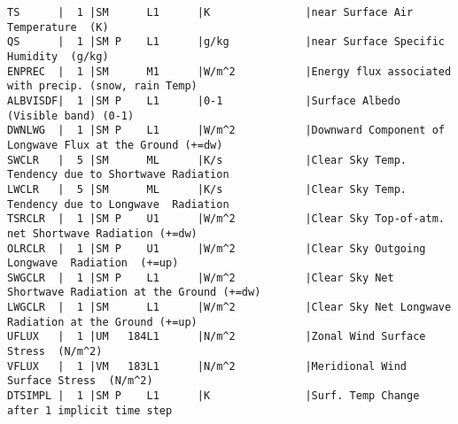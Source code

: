 \begin{verbatim}
TS      |  1 |SM      L1      |K               |near Surface Air Temperature  (K)
QS      |  1 |SM P    L1      |g/kg            |near Surface Specific Humidity  (g/kg)
ENPREC  |  1 |SM      M1      |W/m^2           |Energy flux associated with precip. (snow, rain Temp)
ALBVISDF|  1 |SM P    L1      |0-1             |Surface Albedo (Visible band) (0-1)
DWNLWG  |  1 |SM P    L1      |W/m^2           |Downward Component of Longwave Flux at the Ground (+=dw)
SWCLR   |  5 |SM      ML      |K/s             |Clear Sky Temp. Tendency due to Shortwave Radiation
LWCLR   |  5 |SM      ML      |K/s             |Clear Sky Temp. Tendency due to Longwave  Radiation
TSRCLR  |  1 |SM P    U1      |W/m^2           |Clear Sky Top-of-atm. net Shortwave Radiation (+=dw)
OLRCLR  |  1 |SM P    U1      |W/m^2           |Clear Sky Outgoing Longwave  Radiation  (+=up)
SWGCLR  |  1 |SM P    L1      |W/m^2           |Clear Sky Net Shortwave Radiation at the Ground (+=dw)
LWGCLR  |  1 |SM      L1      |W/m^2           |Clear Sky Net Longwave  Radiation at the Ground (+=up)
UFLUX   |  1 |UM   184L1      |N/m^2           |Zonal Wind Surface Stress  (N/m^2)
VFLUX   |  1 |VM   183L1      |N/m^2           |Meridional Wind Surface Stress  (N/m^2)
DTSIMPL |  1 |SM P    L1      |K               |Surf. Temp Change after 1 implicit time step
\end{verbatim}
